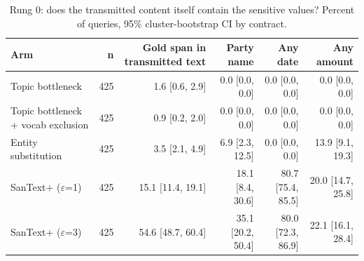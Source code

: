 \begin{table}[t]
\centering\small
\caption{Rung 0: does the transmitted content itself contain the sensitive values? Percent of queries, 95\% cluster-bootstrap CI by contract.}
\label{tab:leak}
\begin{tabular}{lrrrrr}
\toprule
Arm & n & Gold span in transmitted text & Party name & Any date & Any amount \\
\midrule
Topic bottleneck & 425 & 1.6 [0.6, 2.9] & 0.0 [0.0, 0.0] & 0.0 [0.0, 0.0] & 0.0 [0.0, 0.0] \\
Topic bottleneck + vocab exclusion & 425 & 0.9 [0.2, 2.0] & 0.0 [0.0, 0.0] & 0.0 [0.0, 0.0] & 0.0 [0.0, 0.0] \\
Entity substitution & 425 & 3.5 [2.1, 4.9] & 6.9 [2.3, 12.5] & 0.0 [0.0, 0.0] & 13.9 [9.1, 19.3] \\
SanText+ ($\varepsilon$=1) & 425 & 15.1 [11.4, 19.1] & 18.1 [8.4, 30.6] & 80.7 [75.4, 85.5] & 20.0 [14.7, 25.8] \\
SanText+ ($\varepsilon$=3) & 425 & 54.6 [48.7, 60.4] & 35.1 [20.2, 50.4] & 80.0 [72.3, 86.9] & 22.1 [16.1, 28.4] \\
\bottomrule
\end{tabular}
\end{table}

